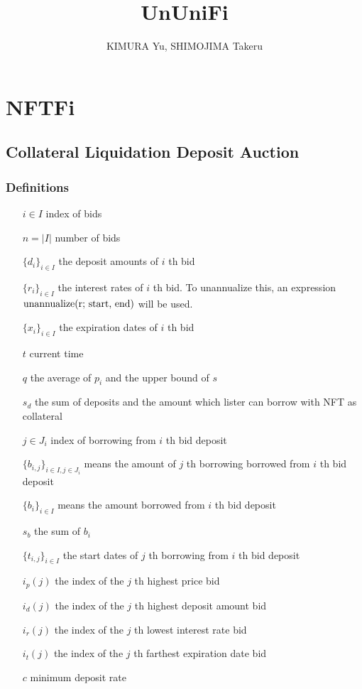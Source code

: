\documentclass[dvipdfmx]{jsarticle}
\title{UnUniFi}
\author{KIMURA Yu, SHIMOJIMA Takeru}
\begin{document}

\maketitle

\section{NFTFi}

\subsection{Collateral Liquidation Deposit Auction}

\subsubsection{Definitions}

\begin{itemize}
  \item[$i \in I$] index of bids
  \item[$n = |I|$] number of bids
  \item[$\{d_i\}_{i \in I}$] the deposit amounts of $i$ th bid
  \item[$\{r_i\}_{i \in I}$] the interest rates of $i$ th bid. To unannualize this, an expression $\text{unannualize(r; \text{start}, \text{end})}$ will be used.
  \item[$\{x_i\}_{i \in I}$] the expiration dates of $i$ th bid
  \item[$t$] current time 
  \item[$q$] the average of $p_i$ and the upper bound of $s$
  \item[$s_d$] the sum of deposits and the amount which lister can borrow with NFT as collateral
  \item[$j \in J_i$] index of borrowing from $i$ th bid deposit 
  \item[$\{b_{i,j}\}_{i \in I, j \in J_i}$] means the amount of $j$ th borrowing borrowed from $i$ th bid deposit
  \item[$\{b_i\}_{i \in I}$] means the amount borrowed from $i$ th bid deposit
  \item[$s_b$] the sum of $b_i$
  \item[$\{t_{i,j}\}_{i \in I}$] the start dates of $j$ th borrowing from $i$ th bid deposit
  \item[$i_p(j)$] the index of the $j$ th highest price bid
  \item[$i_d(j)$] the index of the $j$ th highest deposit amount bid
  \item[$i_r(j)$] the index of the $j$ th lowest interest rate bid
  \item[$i_t(j)$] the index of the $j$ th farthest expiration date bid
  \item[$c$] minimum deposit rate
\end{itemize}
\end{document}
